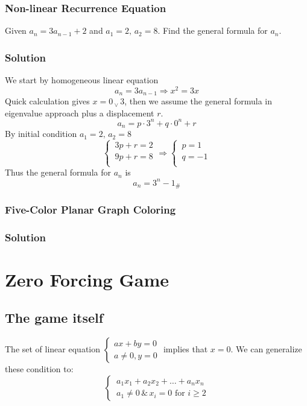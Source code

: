 \documentclass[11pt]{article}
\begin{document}
\subsubsection{Non-linear Recurrence Equation}
Given $a_n=3a_{n-1}+2$  and $a_1 = 2,\,a_2 = 8$. Find the general formula for $a_n$. 
\subsubsection*{Solution}
We start by  homogeneous linear equation
\[
    a_n=3a_{n-1}\Rightarrow x^2=3x
\]
Quick calculation gives $\displaystyle x=0 \,_\lor \,3$, then we assume the general formula in eigenvalue approach plus a displacement $r$.
\[
    a_n=p\cdot 3^n + q\cdot 0^n + r
\]
By initial condition $a_1 = 2,\, a_2 = 8$
\[
    \begin{cases}
        \displaystyle
        \,3p+r=2\\
        \displaystyle
        \,9p+r=8\\
    \end{cases}
    \Rightarrow
    \begin{cases}
        \displaystyle
        \,p=1\\
        \displaystyle
        \,q=-1\\
    \end{cases}
\]
Thus the general formula for $a_n$ is 
\[
    a_n = 3^n - 1 _\#
\]
\subsubsection{Five-Color Planar Graph Coloring}
\subsubsection*{Solution}



\section{Zero Forcing Game}
\subsection{The game itself}
The set of linear equation 
$\begin{cases}
    ax+by=0\\
    a\neq 0, y= 0
\end{cases}$ implies that $x=0$. We can generalize these condition to: 
\[
    \begin{cases}
        \displaystyle
        \,a_1x_1+a_2x_2+\dots+a_nx_n\\
        \displaystyle
        \,a_1 \neq 0 \, \& \, x_i = 0 \text{ for } i \geq 2
    \end{cases}
\]
\end{document}
